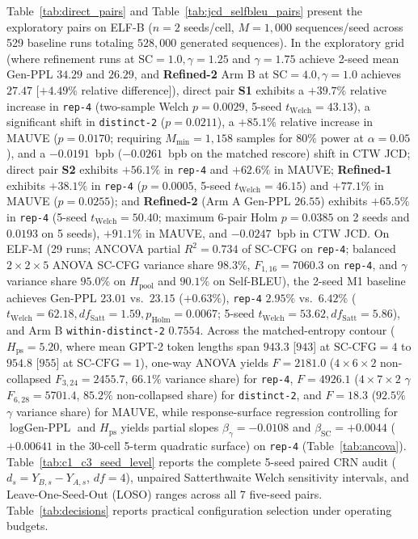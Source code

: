 \documentclass[11pt,a4paper]{article}
\begin{document}
Table~\ref{tab:direct_pairs} and Table~\ref{tab:jcd_selfbleu_pairs} present the exploratory pairs on ELF-B ($n=2$ seeds/cell, $M=1{,}000$ sequences/seed across 529 baseline runs totaling $528{,}000$ generated sequences). In the exploratory grid (where refinement runs at $\text{SC}=1.0, \gamma=1.25$ and $\gamma=1.75$ achieve 2-seed mean Gen-PPL $34.29$ and $26.29$, and \textbf{Refined-2} Arm B at $\text{SC}=4.0, \gamma=1.0$ achieves $27.47$ [$+4.49\%$ relative difference]), direct pair \textbf{S1} exhibits a $+39.7\%$ relative increase in \texttt{rep-4} (two-sample Welch $p=0.0029$, 5-seed $t_{\mathrm{Welch}}=43.13$), a significant shift in \texttt{distinct-2} ($p=0.0211$), a $+85.1\%$ relative increase in MAUVE ($p=0.0170$; requiring $M_{\min}=1{,}158$ samples for $80\%$ power at $\alpha=0.05$), and a $-0.0191$~bpb ($-0.0261$~bpb on the matched rescore) shift in CTW JCD; direct pair \textbf{S2} exhibits $+56.1\%$ in \texttt{rep-4} and $+62.6\%$ in MAUVE; \textbf{Refined-1} exhibits $+38.1\%$ in \texttt{rep-4} ($p=0.0005$, 5-seed $t_{\mathrm{Welch}}=46.15$) and $+77.1\%$ in MAUVE ($p=0.0255$); and \textbf{Refined-2} (Arm A Gen-PPL $26.55$) exhibits $+65.5\%$ in \texttt{rep-4} (5-seed $t_{\mathrm{Welch}}=50.40$; maximum 6-pair Holm $p=0.0385$ on 2 seeds and $0.0193$ on 5 seeds), $+91.1\%$ in MAUVE, and $-0.0247$~bpb in CTW JCD. On ELF-M (29 runs; ANCOVA partial $R^2=0.734$ of SC-CFG on \texttt{rep-4}; balanced $2\times 2\times 5$ ANOVA SC-CFG variance share $98.3\%$, $F_{1,16}=7060.3$ on \texttt{rep-4}, and $\gamma$ variance share $95.0\%$ on $H_{\mathrm{pool}}$ and $90.1\%$ on Self-BLEU), the 2-seed M1 baseline achieves Gen-PPL $23.01$ vs.\ $23.15$ ($+0.63\%$), \texttt{rep-4} $2.95\%$ vs.\ $6.42\%$ ($t_{\mathrm{Welch}}=62.18, df_{\mathrm{Satt}}=1.59, p_{\mathrm{Holm}}=0.0067$; 5-seed $t_{\mathrm{Welch}}=53.62, df_{\mathrm{Satt}}=5.86$), and Arm B \texttt{within-distinct-2} $0.7554$. Across the matched-entropy contour ($H_{\mathrm{ps}}=5.20$, where mean GPT-2 token lengths span $943.3$ [$943$] at $\text{SC-CFG}=4$ to $954.8$ [$955$] at $\text{SC-CFG}=1$), one-way ANOVA yields $F=2181.0$ ($4\times 6\times 2$ non-collapsed $F_{3,24}=2455.7$, $66.1\%$ variance share) for \texttt{rep-4}, $F=4926.1$ ($4\times 7\times 2$ $\gamma$ $F_{6,28}=5701.4$, $85.2\%$ non-collapsed share) for \texttt{distinct-2}, and $F=18.3$ ($92.5\%$ $\gamma$ variance share) for MAUVE, while response-surface regression controlling for $\log\text{Gen-PPL}$ and $H_{\mathrm{ps}}$ yields partial slopes $\beta_{\gamma} = -0.0108$ and $\beta_{\mathrm{SC}} = +0.0044$ ($+0.00641$ in the 30-cell 5-term quadratic surface) on \texttt{rep-4} (Table~\ref{tab:ancova}). Table~\ref{tab:c1_c3_seed_level} reports the complete 5-seed paired CRN audit ($d_s = Y_{B,s} - Y_{A,s}$, $df=4$), unpaired Satterthwaite Welch sensitivity intervals, and Leave-One-Seed-Out (LOSO) ranges across all 7 five-seed pairs. Table~\ref{tab:decisions} reports practical configuration selection under operating budgets.
\end{document}
